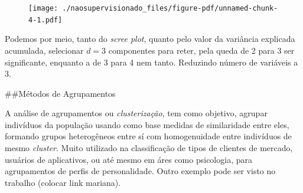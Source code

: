 \documentclass[
  letterpaper,
  DIV=11,
  numbers=noendperiod]{scrreprt}
\newenvironment{Shaded}{\begin{snugshade}}{\end{snugshade}}
\newcommand{\AttributeTok}[1]{\textcolor[rgb]{0.40,0.45,0.13}{#1}}
\newcommand{\CommentTok}[1]{\textcolor[rgb]{0.37,0.37,0.37}{#1}}
\newcommand{\DecValTok}[1]{\textcolor[rgb]{0.68,0.00,0.00}{#1}}
\newcommand{\FunctionTok}[1]{\textcolor[rgb]{0.28,0.35,0.67}{#1}}
\newcommand{\NormalTok}[1]{\textcolor[rgb]{0.00,0.23,0.31}{#1}}
\newcommand{\OtherTok}[1]{\textcolor[rgb]{0.00,0.23,0.31}{#1}}
\newcommand{\SpecialCharTok}[1]{\textcolor[rgb]{0.37,0.37,0.37}{#1}}
\newcommand{\StringTok}[1]{\textcolor[rgb]{0.13,0.47,0.30}{#1}}
\begin{document}
\begin{Shaded}
\end{Shaded}

\begin{figure}[H]

{\centering \texttt{[image: ./naosupervisionado\_files/figure-pdf/unnamed-chunk-4-1.pdf]}

}

\end{figure}

Podemos por meio, tanto do \emph{scree plot}, quanto pelo valor da
variância explicada acumulada, selecionar \(d= 3\) componentes para
reter, pela queda de 2 para 3 ser significante, enquanto a de 3 para 4
nem tanto. Reduzindo número de variáveis a 3.

\#\#Métodos de Agrupamentos

A análise de agrupamentos ou \emph{clusterização}, tem como objetivo,
agrupar indivíduos da população usando como base medidas de similaridade
entre eles, formando grupos heterogêneos entre sí com homogenuidade
entre indivíduos de mesmo \emph{cluster}. Muito utilizado na
classificação de tipos de clientes de mercado, usuários de aplicativos,
ou até mesmo em áres como psicologia, para agrupamentos de perfis de
personalidade. Outro exemplo pode ser visto no trabalho (colocar link
mariana).
\end{document}

